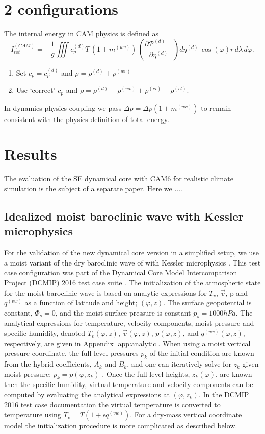 \documentclass{agujournal}
\begin{document}
\section{2 configurations}
The internal energy in CAM physics is defined as
\begin{equation}
I_{tot}^{(CAM)}=-\frac{1}{g}\iiint c_p^{(d)} T\, (1+m^{(wv)})\, \left( \frac{\partial \mathcal{P}^{(d)}\quad }{\partial \eta^{(d)}} \right) d\eta^{(d)}\, \cos(\varphi) r\, d\lambda\, d\varphi.
\end{equation}
\begin{enumerate}
\item Set $c_p=c_p^{(d)}$ and $\rho=\rho^{(d)}+\rho^{(wv)}$
\item Use `correct' $c_p$ and $\rho=\rho^{(d)}+\rho^{(wv)}+\rho^{(ci)}+\rho^{(cl)}$.
\end{enumerate}
In dynamics-physics coupling we pass $\Delta p=\Delta p \left( 1+m^{(wv)}\right)$ to remain consistent with the physics definition of total energy. 

\section{Results}\label{sec:results}
The evaluation of the SE dynamical core with CAM6 for realistic climate simulation is the subject of a separate paper. Here we ....
\subsection{Idealized moist baroclinic wave with Kessler microphysics}
For the validation of the new dynamical core version in a simplified setup, we use a moist variant of the dry baroclinic wave of \citet{UMJS2014QJRMS} with Kessler microphysics \citep{K1969MM}. This test case configuration was part of the Dynamical Core Model Intercomparison Project (DCMIP) 2016 test case suite {\color{red}{[DCMIP citation]}}. The initialization of the atmospheric state for the moist baroclinic wave is based on analytic expressions for $T_v$, $\vec{v}$, p and $q^{(vw)}$ as a function of latitude and height; $(\varphi,z)$. The surface geopotential is constant, $\Phi_s=0$, and the moist surface pressure is constant $p_s=1000hPa$. The analytical expressions for temperature, velocity components, moist pressure and specific humidity, denoted ${T_v}(\varphi,z)$, ${\vec{v}}(\varphi,z)$, ${p}(\varphi,z)$, and $q^{(wv)}(\varphi,z)$, respectively, are given in Appendix \ref{app:analytic}. When using a moist vertical pressure coordinate, the full level pressures $p_k$ of the initial condition are known from the hybrid coefficients, $A_k$ and $B_k$, and one can iteratively solve for $z_k$ given moist pressure: $p_k={p}(\varphi,z_k)$ \citep[see, ][]{UMJS2014QJRMS}. Once the full level heights, $z_k(\varphi)$, are known then the specific humidity, virtual temperature and velocity components can be computed by evaluating the analytical expressions at $(\varphi,z_k)$. In the DCMIP 2016 test case documentation the virtual temperature is converted to temperature using $T_v=T\left( 1+\epsilon q^{(vw)}\right)$. For a dry-mass vertical coordinate model the initialization procedure is more complicated as described below.
\end{document}
